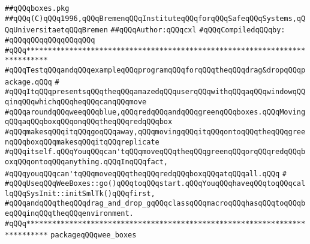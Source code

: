 \label{src/lib/tk/src/toolkit/tests+examples/boxes.pkg}
\verb|##qQQqboxes.pkg|\newline
\verb|##qQQq(C)qQQq1996,qQQqBremenqQQqInstituteqQQqforqQQqSafeqQQqSystems,qQQqUniversitaetqQQqBremen|\newline
\verb|##qQQqAuthor:qQQqcxl|\newline
\newline
\verb|#qQQqCompiledqQQqby:|\newline
\verb|#qQQqqQQqqQQqqQQqqQQq|\newline
\newline
\newline
\newline
\verb|#qQQq***************************************************************************|\newline
\verb|#qQQqTestqQQqandqQQqexampleqQQqprogramqQQqforqQQqtheqQQqdrag&dropqQQqpackage.qQQq|\newline
\verb|#|\newline
\verb|#qQQqItqQQqpresentsqQQqtheqQQqamazedqQQquserqQQqwithqQQqaqQQqwindowqQQqinqQQqwhichqQQqheqQQqcanqQQqmove|\newline
\verb|#qQQqaroundqQQqweeqQQqblue,qQQqredqQQqandqQQqgreenqQQqboxes.qQQqMovingqQQqaqQQqboxqQQqonqQQqtheqQQqredqQQqbox|\newline
\verb|#qQQqmakesqQQqitqQQqgoqQQqaway,qQQqmovingqQQqitqQQqontoqQQqtheqQQqgreenqQQqboxqQQqmakesqQQqitqQQqreplicate|\newline
\verb|#qQQqitself.qQQqYouqQQqcan'tqQQqmoveqQQqtheqQQqgreenqQQqorqQQqredqQQqboxqQQqontoqQQqanything.qQQqInqQQqfact,|\newline
\verb|#qQQqyouqQQqcan'tqQQqmoveqQQqtheqQQqredqQQqboxqQQqatqQQqall.qQQq|\newline
\verb|#|\newline
\verb|#qQQqUseqQQqWeeBoxes::go()qQQqtoqQQqstart.qQQqYouqQQqhaveqQQqtoqQQqcallqQQqSysInit::initSmlTk()qQQqfirst,|\newline
\verb|#qQQqandqQQqtheqQQqdrag_and_drop_gqQQqclassqQQqmacroqQQqhasqQQqtoqQQqbeqQQqinqQQqtheqQQqenvironment.|\newline
\verb|#qQQq***************************************************************************|\newline
\newline
\newline
\verb|packageqQQqwee_boxes|\newline
